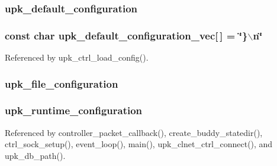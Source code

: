 \subsubsection[{upk\_\-default\_\-configuration}]{ {\bf upk\_\-default\_\-configuration}}\label{group__config__impl_gaefda54e715b67195adc6ee3b56671e56}
\subsubsection[{upk\_\-default\_\-configuration\_\-vec}]{\setlength{\rightskip}{0pt plus 5cm}const char {\bf upk\_\-default\_\-configuration\_\-vec}[$\,$] = \char`\"{}\}$\backslash$n\char`\"{}}\label{group__config__impl_ga3f4f40d56f2c3f75a25d5d62e238a362}


Referenced by upk\_\-ctrl\_\-load\_\-config().

\subsubsection[{upk\_\-file\_\-configuration}]{ {\bf upk\_\-file\_\-configuration}}\label{group__config__impl_ga63e376b66da63c0b37258f999eff12f8}
\subsubsection[{upk\_\-runtime\_\-configuration}]{ {\bf upk\_\-runtime\_\-configuration}}\label{group__config__impl_gaf7638ba77297c6ad954805d92fa33c13}


Referenced by controller\_\-packet\_\-callback(), create\_\-buddy\_\-statedir(), ctrl\_\-sock\_\-setup(), event\_\-loop(), main(), upk\_\-clnet\_\-ctrl\_\-connect(), and upk\_\-db\_\-path().

